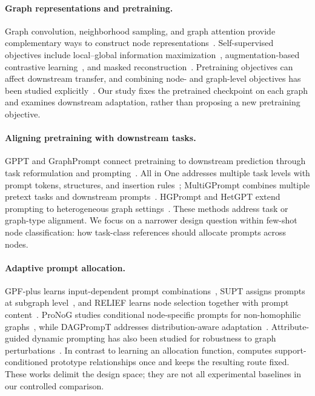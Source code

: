 \paragraph{Graph representations and pretraining.}
Graph convolution, neighborhood sampling, and graph attention provide complementary ways to construct node representations~\citep{gcn2017,sage2017,gat2018}. Self-supervised objectives include local--global information maximization~\citep{dgi2019}, augmentation-based contrastive learning~\citep{graphcl2020}, and masked reconstruction~\citep{graphmae2022}. Pretraining objectives can affect downstream transfer, and combining node- and graph-level objectives has been studied explicitly~\citep{pretrain2020}. Our study fixes the pretrained checkpoint on each graph and examines downstream adaptation, rather than proposing a new pretraining objective.

\paragraph{Aligning pretraining with downstream tasks.}
GPPT and GraphPrompt connect pretraining to downstream prediction through task reformulation and prompting~\citep{gppt2022,graphprompt2023}. All in One addresses multiple task levels with prompt tokens, structures, and insertion rules~\citep{allinone2023}; MultiGPrompt combines multiple pretext tasks and downstream prompts~\citep{multigprompt2024}. HGPrompt and HetGPT extend prompting to heterogeneous graph settings~\citep{hgprompt2024,hetgpt2024}. These methods address task or graph-type alignment. We focus on a narrower design question within few-shot node classification: how task-class references should allocate prompts across nodes.

\paragraph{Adaptive prompt allocation.}
GPF-plus learns input-dependent prompt combinations~\citep{gpf2023}, SUPT assigns prompts at subgraph level~\citep{supt2026}, and RELIEF learns node selection together with prompt content~\citep{relief2025}. ProNoG studies conditional node-specific prompts for non-homophilic graphs~\citep{pronog2025}, while DAGPrompT addresses distribution-aware adaptation~\citep{dagprompt2025}. Attribute-guided dynamic prompting has also been studied for robustness to graph perturbations~\citep{adprompt2026}. In contrast to learning an allocation function, \method{} computes support-conditioned prototype relationships once and keeps the resulting route fixed. These works delimit the design space; they are not all experimental baselines in our controlled comparison.

